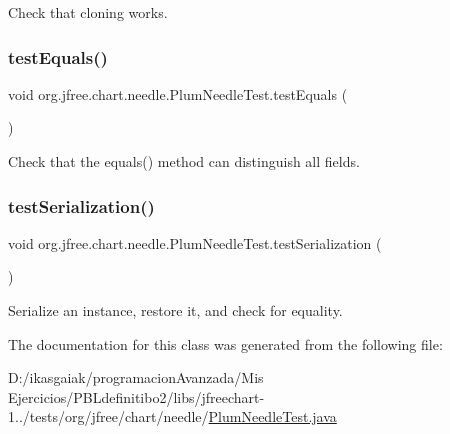 Check that cloning works. \mbox{\label{classorg_1_1jfree_1_1chart_1_1needle_1_1_plum_needle_test_a5093b788a00ddc088d93e57c560089fc}} 
\subsubsection{\texorpdfstring{test\+Equals()}{testEquals()}}
{\footnotesize\ttfamily void org.\+jfree.\+chart.\+needle.\+Plum\+Needle\+Test.\+test\+Equals (\begin{DoxyParamCaption}{ }\end{DoxyParamCaption})}

Check that the equals() method can distinguish all fields. \mbox{\label{classorg_1_1jfree_1_1chart_1_1needle_1_1_plum_needle_test_af8eb727a581d3d362d5c50b2879d3006}} 
\subsubsection{\texorpdfstring{test\+Serialization()}{testSerialization()}}
{\footnotesize\ttfamily void org.\+jfree.\+chart.\+needle.\+Plum\+Needle\+Test.\+test\+Serialization (\begin{DoxyParamCaption}{ }\end{DoxyParamCaption})}

Serialize an instance, restore it, and check for equality. 

The documentation for this class was generated from the following file\+:\begin{DoxyCompactItemize}
\item 
D\+:/ikasgaiak/programacion\+Avanzada/\+Mis Ejercicios/\+P\+B\+Ldefinitibo2/libs/jfreechart-\/1../tests/org/jfree/chart/needle/\mbox{\hyperlink{_plum_needle_test_8java}{Plum\+Needle\+Test.\+java}}\end{DoxyCompactItemize}
